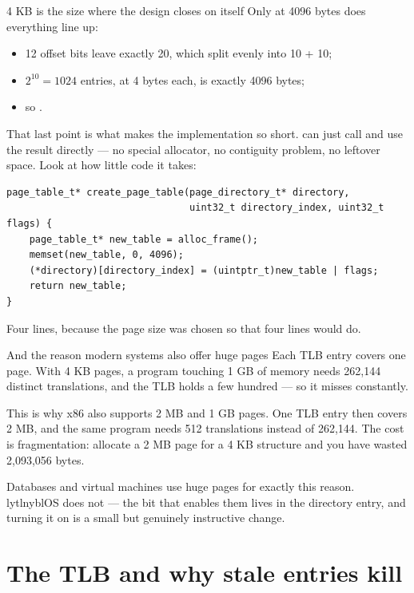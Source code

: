 \begin{concept}{4 KB is the size where the design closes on itself}
Only at 4096 bytes does everything line up:
\begin{itemize}
  \item 12 offset bits leave exactly 20, which split evenly into 10 + 10;
  \item $2^{10} = 1024$ entries, at 4 bytes each, is exactly 4096 bytes;
  \item so .
\end{itemize}
That last point is what makes the implementation so short.  can just call
 and use the result directly --- no special allocator, no contiguity problem, no
leftover space. Look at how little code it takes:
\begin{lstlisting}[style=c]
page_table_t* create_page_table(page_directory_t* directory,
                                uint32_t directory_index, uint32_t flags) {
    page_table_t* new_table = alloc_frame();
    memset(new_table, 0, 4096);
    (*directory)[directory_index] = (uintptr_t)new_table | flags;
    return new_table;
}
\end{lstlisting}
Four lines, because the page size was chosen so that four lines would do.
\end{concept}

\begin{warn}{And the reason modern systems also offer huge pages}
Each TLB entry covers one page. With 4 KB pages, a program touching 1 GB of memory needs 262,144
distinct translations, and the TLB holds a few hundred --- so it misses constantly.

This is why x86 also supports 2 MB and 1 GB pages. One TLB entry then covers 2 MB, and the same
program needs 512 translations instead of 262,144. The cost is fragmentation: allocate a 2 MB page
for a 4 KB structure and you have wasted 2,093,056 bytes.

Databases and virtual machines use huge pages for exactly this reason. lytlnyblOS does not --- the
bit that enables them lives in the directory entry, and turning it on is a small but genuinely
instructive change.
\end{warn}

\section{The TLB and why stale entries kill}

